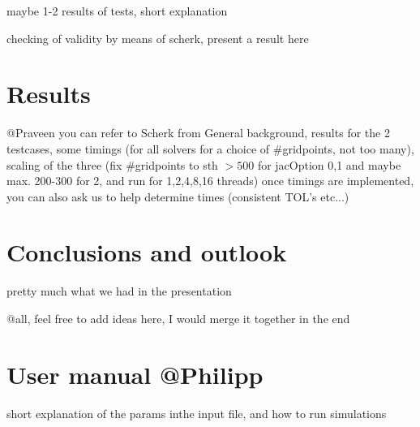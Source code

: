 \documentclass[11pt]{scrartcl}
\begin{document}
maybe 1-2 results of tests, short explanation

checking of validity by means of scherk, present a result here

\section{Results}
@Praveen you can refer to Scherk from General background, 
results for the 2 testcases, some timings (for all solvers for a choice of $\#$gridpoints, not too many), scaling of the three (fix $\#$gridpoints to sth $>500$ for jacOption 0,1 and maybe max. 200-300 for 2, and run for 1,2,4,8,16 threads)
once timings are implemented, you can also ask us to help determine times (consistent TOL's etc...)


\section{Conclusions and outlook}
pretty much what we had in the presentation

@all, feel free to add ideas here, I would merge it together in the end


%


\appendix
\section{User manual @Philipp}
short explanation of the params inthe input file, and how to run simulations
\end{document}
